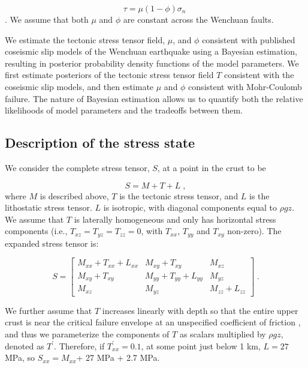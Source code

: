 \documentclass[draft,jgrga]{AGUTeX}
\begin{document}
\begin{article}
\begin{equation} 
\tau = \mu (1 - \phi) \sigma_n \; 
\label{eqn:amonton} 
\end{equation}
\citep[e.g.,][]{sibson1985}. We assume that both $\mu$ and $\phi$ are
constant across the Wenchuan faults.

We estimate the tectonic stress tensor field, $\mu$, and $\phi$
consistent with published coseismic slip models of the Wenchuan
earthquake using a Bayesian estimation, resulting in posterior probability 
density functions of the model parameters. 
We first estimate posteriors of the tectonic stress tensor field 
$T$ consistent with
the coseismic slip models, and then estimate $\mu$ and $\phi$ consistent
with Mohr-Coulomb failure. The nature of Bayesian estimation allows us
to quantify both the relative likelihoods of model parameters and the
tradeoffs between them.

\subsection{Description of the stress
state}\label{description-of-the-stress-state}

We consider the complete stress tensor, $S$, at a point in the crust to
be

\begin{equation}
S = M + T + L \; ,
\end{equation}
where $M$ is described above, $T$ is the tectonic stress tensor, and $L$
is the lithostatic stress tensor. $L$ is isotropic, with diagonal
components equal to $\rho g z$. We assume that $T$ is laterally
homogeneous and only has horizontal stress components (i.e.,
$T_{xz} = T_{yz} = T_{zz} = 0$, with $T_{xx}$, $T_{yy}$ and $T_{xy}$
non-zero). The expanded stress tensor is:

\begin{equation}
S = \begin{bmatrix}
  M_{xx} + T_{xx} + L_{xx} & M_{xy} + T_{xy} &  M_{xz} \\
	M_{xy} + T_{xy} &  M_{yy} + T_{yy} + L_{yy} & M_{yz} \\
	M_{xz}     &  M_{yz}  &  M_{zz} + L_{zz}
	\end{bmatrix} \; .
\label{eqn:stress_tensor}
\end{equation}

We further assume that $T$ increases linearly with depth so
that the entire upper crust is near the critical failure envelope
at an unspecified coefficient of friction
\citep[e.g.,][]{townend2000}, and thus we parameterize the components of $T$
as scalars multiplied by $\rho g z$, denoted as $T^\prime$. Therefore, if
$T^\prime_{xx} = 0.1$, at some point just below 1 km, $L=27$ MPa, so
$S_{xx} = M_{xx}$+ 27 MPa + 2.7 MPa.




\end{article}
\end{document}
